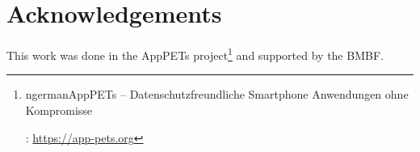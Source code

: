 \documentclass[
	parskip = half,
	headings = small,
	twocolumn = true,
	bibliography = totoc,
]{scrartcl}
\author{%
	Maximilian Blochberger\\
	\small\texttt{blochberger@informatik.uni-hamburg.de}
}
\title{\DocumentTitle}
\date{\today}
\begin{document}
	\maketitle

	

	\section*{Acknowledgements}
	This work was done in the AppPETs project\footnote{\begin{otherlanguage*}{ngerman}AppPETs – Datenschutzfreundliche Smartphone Anwendungen ohne Kompromisse\end{otherlanguage*}: \url{https://app-pets.org}} and supported by the BMBF.

	\printbibliography%
\end{document}
